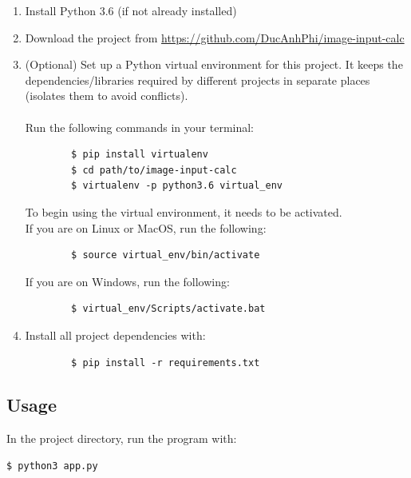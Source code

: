 \documentclass[12pt]{article}
\begin{document}
	\begin{enumerate}
		\item Install Python 3.6 (if not already installed)
		\item Download the project from \url{https://github.com/DucAnhPhi/image-input-calc}
		\item (Optional) Set up a Python virtual environment for this project. It keeps the dependencies/libraries required by different projects in separate places (isolates them to avoid conflicts). \\
		\\
		Run the following commands in your terminal:
		\begin{verbatim}
		$ pip install virtualenv
		$ cd path/to/image-input-calc
		$ virtualenv -p python3.6 virtual_env
		\end{verbatim}
		To begin using the virtual environment, it needs to be activated.
		\\
		If you are on Linux or MacOS, run the following:

		\begin{verbatim}
		$ source virtual_env/bin/activate
		\end{verbatim}

		If you are on Windows, run the following:

		\begin{verbatim}
		$ virtual_env/Scripts/activate.bat
		\end{verbatim}

		\item Install all project dependencies with:
		\begin{verbatim}
		$ pip install -r requirements.txt
		\end{verbatim}
	\end{enumerate}




\subsection{Usage}
In the project directory, run the program with:

\begin{verbatim}
$ python3 app.py
\end{verbatim}

\newpage
\printbibliography[heading=bibintoc, title={Sources}]
\end{document}
